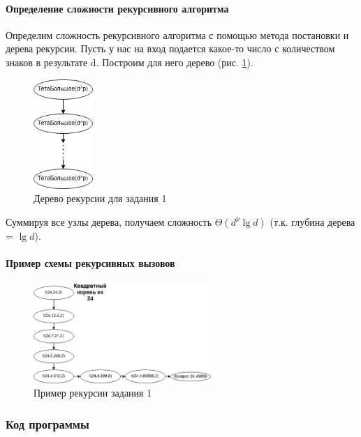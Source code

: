 \documentclass[a4paper, 14pt]{extarticle}
\begin{document}
\paragraph{Определение сложности рекурсивного алгоритма}
Определим сложность рекурсивного алгоритма с помощью метода постановки
и дерева рекурсии. Пусть у нас на вход подается какое-то число с количеством
знаков в результате d. Построим для него дерево
(рис. \ref{fig:tree1}).
\begin{figure}[htpb]
  \centering
  \includegraphics[width=0.2\textwidth]{pictures/tree1.png}
  \caption{Дерево рекурсии для задания 1}
  \label{fig:tree1}
\end{figure}
Суммируя все узлы дерева, получаем сложность $\Theta(d^p\lg d)$ (т.к. глубина дерева =  $ \lg d$).
\newpage
\paragraph{Пример схемы рекурсивных вызовов}
\begin{figure}[htpb]
  \centering
  \includegraphics[width=0.6\textwidth]{pictures/tree1_ex.png}
  \caption{Пример рекурсии задания 1}
  \label{fig:tree1_ex}
\end{figure}
\subsubsection{Код программы}

\end{document}

